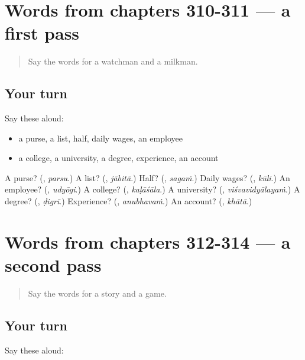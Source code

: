 \section[(dialogue)]{Words from chapters 310-311 — a first pass}

\label{lesson:TE-R314-first-pass-words-from-chapters-310-311}



\begin{quote}
Say the words for a watchman and a milkman.
\end{quote}

\subsection*{Your turn}
Say these aloud:

\begin{itemize}
\raggedright
  \item a purse, a list, half, daily wages, an employee
  \item a college, a university, a degree, experience, an account
\end{itemize}

\begin{tcolorbox}[breakable,colback=teal!4,colframe=teal!35!black,title={Before you move on}]
A purse? (\textbf{}, \emph{parsu}.) A list? (\textbf{}, \emph{jābitā}.) Half? (\textbf{}, \emph{sagaṁ}.) Daily wages? (\textbf{}, \emph{kūli}.) An employee? (\textbf{}, \emph{udyōgi}.) A college? (\textbf{}, \emph{kaḷāśāla}.) A university? (\textbf{}, \emph{viśvavidyālayaṁ}.) A degree? (\textbf{}, \emph{ḍigrī}.) Experience? (\textbf{}, \emph{anubhavaṁ}.) An account? (\textbf{}, \emph{khātā}.)
\end{tcolorbox}
\section[(dialogue)]{Words from chapters 312-314 — a second pass}

\label{lesson:TE-R314-second-pass-words-from-chapters-312-314}



\begin{quote}
Say the words for a story and a game.
\end{quote}

\subsection*{Your turn}
Say these aloud:


